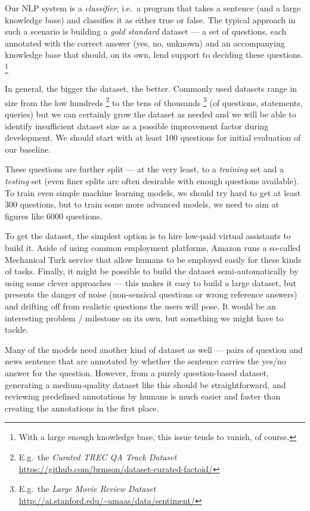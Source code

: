 \documentclass[11pt,a4paper]{article}
\begin{document}
Our NLP system is a \textit{classifier}, i.e.\ a program that takes
a sentence (and a large knowledge base) and classifies it as either
true or false.  The typical approach in such a scenario is building
a \textit{gold standard} dataset --- a set of questions, each annotated
with the correct answer (yes, no, unknown) and an accompanying knowledge
base that should, on its own, lend support to deciding these questions.%
\footnote{With a large enough knowledge base, this issue tends to vanish,
of course.}

In general, the bigger the dataset, the better.  Commonly used datasets
range in size from the low hundreds%
\footnote{E.g.\ the \textit{Curated TREC QA Track Dataset} \url{https://github.com/brmson/dataset-curated-factoid/}}
to the tens of thousands%
\footnote{E.g.\ the \textit{Large Movie Review Dataset} \url{http://ai.stanford.edu/~amaas/data/sentiment/}}
(of questions, statements, queries)
but we can certainly grow the dataset as needed and we will be able to identify
insufficient dataset size as a possible improvement factor during development.
We should start with at least 100 questions for initial evaluation of our
baseline.

These questions are further split --- at the very least, to a \textit{training}
set and a \textit{testing} set (even finer splits are often desirable
with enough questions available).
To train even simple machine learning models, we should try hard to get
at least 300 questions, but to train some more advanced models, we need
to aim at figures like 6000 questions.

To get the dataset, the simplest option is to hire low-paid virtual assistants
to build it.  Aside of using common employment platforms, Amazon runs a
so-called Mechanical Turk service that allow humans to be employed easily
for these kinds of tasks.  Finally, it might be possible to build the dataset
semi-automatically by using some clever approaches --- this makes it easy
to build a large dataset, but presents the danger of noise (non-sensical questions
or wrong reference answers) and drifting off from realistic questions the
users will pose.  It would be an interesting problem / milestone on its own,
but something we might have to tackle.

Many of the models need another kind of dataset as well --- pairs of question
and news sentence that are annotated by whether the sentence carries the yes/no
answer for the question.  However, from a purely question-based dataset,
generating a medium-quality dataset like this should be straightforward,
and reviewing predefined annotations by humans is much easier and faster
than creating the annotations in the first place.
\end{document}
